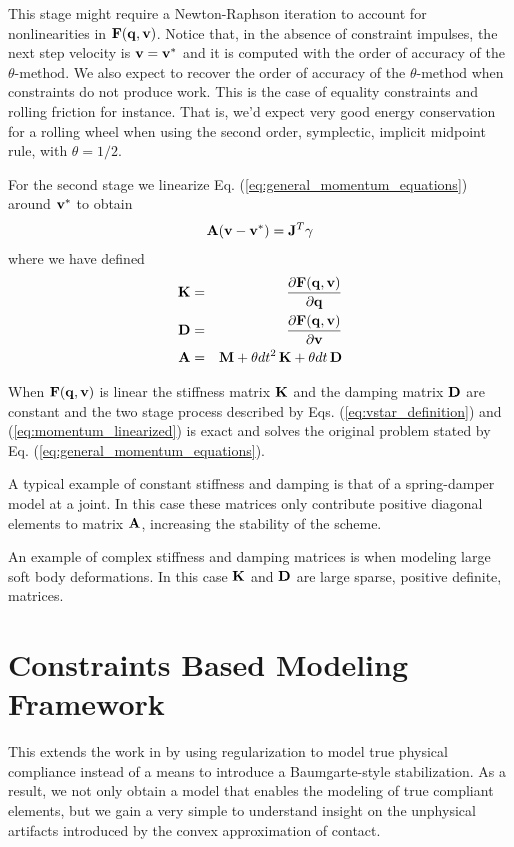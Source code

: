 This stage might require a Newton-Raphson iteration to account for
nonlinearities in ${\mathbf{F}}({\mathbf{q}}, {\mathbf{v}})$. Notice that, in the absence of
constraint impulses, the next step velocity is ${\mathbf{v}}={\mathbf{v}}^*$ and it is
computed with the order of accuracy of the  $\theta\text{-method}$. We also
expect to recover the order of accuracy of the $\theta\text{-method}$ when
constraints do not produce work. This is the case of equality constraints and
rolling friction for instance. That is, we'd expect very good energy
conservation for a rolling wheel when using the second order, symplectic,
implicit midpoint rule, with $\theta=1/2$.

For the second stage we linearize Eq. (\ref{eq:general_momentum_equations})
around ${\mathbf{v}}^*$ to obtain
\begin{eqnarray}
	\mf{A}(\mf{v}-\mf{v}^*)= \mf{J}^T\mf{\gamma}
	\label{eq:momentum_linearized}
\end{eqnarray}
where we have defined
\begin{eqnarray}
	{\mathbf{K}}&=&\frac{\partial {\mathbf{F}}({\mathbf{q}}, {\mathbf{v}})}{\partial {\mathbf{q}}}\\
	{\mathbf{D}}&=&\frac{\partial {\mathbf{F}}({\mathbf{q}}, {\mathbf{v}})}{\partial {\mathbf{v}}}\\
	{\mathbf{A}}&=&{\mathbf{M}}+\theta dt^2\,{\mathbf{K}}+\theta dt\,{\mathbf{D}}
\end{eqnarray}

When ${\mathbf{F}}({\mathbf{q}}, {\mathbf{v}})$ is linear the stiffness matrix ${\mathbf{K}}$ and the
damping matrix ${\mathbf{D}}$ are constant and the two stage process described by Eqs.
(\ref{eq:vstar_definition}) and (\ref{eq:momentum_linearized}) is exact and
solves the original problem stated by Eq. (\ref{eq:general_momentum_equations}).


A typical example of constant stiffness and damping is that of a spring-damper
model at a joint. In this case these matrices only contribute positive diagonal
elements to matrix ${\mathbf{A}}$, increasing the stability of the scheme.

An example of complex stiffness and damping matrices is when modeling large soft
body deformations. In this case ${\mathbf{K}}$ and ${\mathbf{D}}$ are large sparse, positive
definite, matrices.

\section{Constraints Based Modeling Framework}
\label{sec:constraints_based_modeling_framework}

This extends the work in \cite{bib:todorov2014} by using regularization to model
true physical compliance instead of a means to introduce a Baumgarte-style
stabilization. As a result, we not only obtain a model that enables the modeling
of true compliant elements, but we gain a very simple to understand insight on
the unphysical artifacts introduced by the convex approximation of contact.

